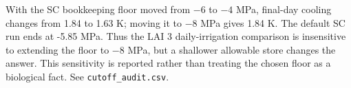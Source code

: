 With the SC bookkeeping floor moved from $-6$ to $-4$ MPa, final-day cooling changes from 1.84 to 1.63 K; moving it to $-8$ MPa gives 1.84 K. The default SC run ends at -5.85 MPa. Thus the LAI 3 daily-irrigation comparison is insensitive to extending the floor to $-8$ MPa, but a shallower allowable store changes the answer. This sensitivity is reported rather than treating the chosen floor as a biological fact. See \texttt{cutoff\_audit.csv}.
